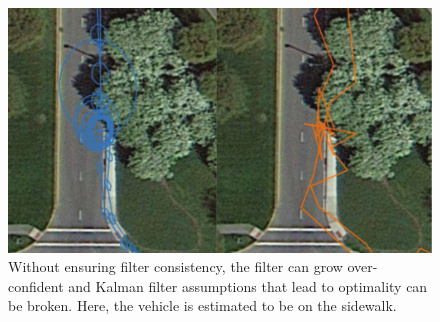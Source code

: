 \begin{figure}
\includegraphics[width=\columnwidth]{airportloop_map_bad}
\caption{Without ensuring filter consistency, the filter can grow over-confident and Kalman filter assumptions that lead to optimality can be broken.  Here, the vehicle is estimated to be on the sidewalk.}
\label{fig:airportloop_map_bad}
\end{figure}
